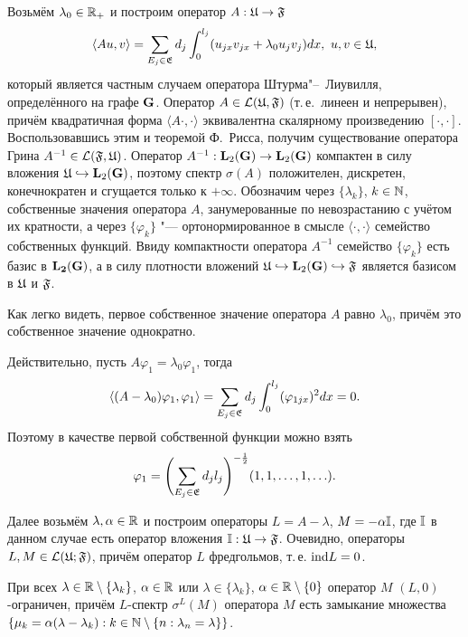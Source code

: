 Возьмём $\lambda_0\in\Bbb R_+$ и построим оператор $A: \frak U\to\frak F$  $$\langle Au,v \rangle = \sum_{E_j\in\frak E} d_j\int_0^{l_j} (u_{jx} v_{jx} + \lambda_0
u_j v_j) dx,\,\, u, v\in\frak U,$$ который является частным случаем оператора Штурма"--~Лиувилля, определённого на графе $\bf G$. Оператор $A\in \cal L (\frak U, \frak F)$
 (т.\,е.~линеен и непрерывен), причём квадратичная форма $\langle A\cdot, \cdot\rangle$ эквивалентна скалярному произведению $[\cdot, \cdot]$.
 Воспользовавшись этим и теоремой Ф.~Рисса, получим существование оператора Грина $A^{-1}\in \cal L(\frak F, \frak U)$. Оператор $A^{-1}: {\bf L}_2({\bf G})\to {\bf L}_2 ({\bf G})$
 компактен в силу вложения   $\frak U\hookrightarrow {\bf L}_2 ({\bf G})$, поэтому спектр $\sigma (A)$ положителен, дискретен, конечнократен и сгущается только к $+\infty$.
 Обозначим через $\{\lambda_k\}$, $k\in\Bbb N$, собственные значения оператора $A$, занумерованные по невозрастанию с учётом их кратности, а через
 $\{\varphi_k\}$ "--- ортонормированное в смысле $\langle\cdot, \cdot\rangle$ семейство собственных функций. 
 Ввиду компактности оператора $A^{-1}$
 семейство $\{\varphi_k\}$ есть базис в $\bf L_2 (G)$, а в силу плотности вложений   $\frak U\hookrightarrow {\bf L}_2 ({\bf G})\hookrightarrow \frak F$ является
 базисом в $\frak U$ и $\frak F$.

\smallskip 
\begin{remark}[1.1] Как легко видеть, первое собственное значение оператора $A$ равно $\lambda_0$, причём  это собственное значение однократно. \end{remark}
\smallskip 

Действительно, пусть $A\varphi_1=\lambda_0 \varphi_1$, тогда $$\left\langle (A-\lambda_0)\varphi_1, \varphi_1\right\rangle=\sum_{E_j\in\frak E} d_j\int_0^{l_j} (\varphi_{1jx})^2 dx=0.$$  Поэтому в качестве первой собственной функции можно взять $$\varphi_1=\Biggl(\sum_{E_j\in\frak E} d_j {l_j}\Biggr)^{-\frac{1}{2}} (1, 1, \ldots, 1, \ldots).$$

Далее возьмём $\lambda, \alpha\in\Bbb R$ и построим операторы $L=A-\lambda$, $M=-\alpha\Bbb I$, где $\Bbb I$ в данном случае есть оператор вложения ${\Bbb I}:\frak U\to\frak F$. 
Очевидно, операторы $L, M \in {\cal L}  (\frak U; \frak F)$, причём оператор $L$ фредгольмов, т.\,е. ${\rm ind} L=0$.

\smallskip
\begin{lemma}[1.1] При всех $\lambda\in{\Bbb R}\setminus\{\lambda_k\}$, $\alpha\in\Bbb R$ или $\lambda\in \{\lambda_k\}$, $\alpha\in{\Bbb R}\setminus\{0\}$ оператор $M$ $(L, 0)$-ограничен, причём $L$-спектр $\sigma^L (M)$ оператора $M$ есть замыкание множества $\{\mu_k=\alpha (\lambda -\lambda_k): k\in {\Bbb N}\setminus \{n: \lambda_n =\lambda\}\}$.  \end{lemma}

